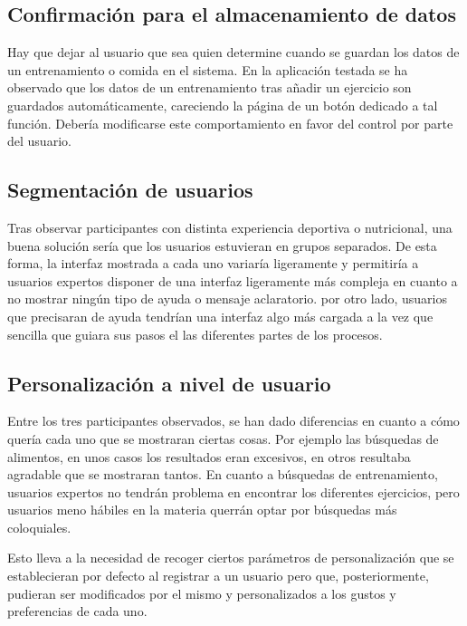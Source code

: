 \documentclass[a4paper]{article}
\begin{document}
	\subsection{Confirmación para el almacenamiento de datos}
	
	Hay que dejar al usuario que sea quien determine cuando se guardan los datos de un entrenamiento o comida en el sistema. En la aplicación testada se ha observado que los datos de un entrenamiento tras añadir un ejercicio son guardados automáticamente, careciendo la página de un botón dedicado a tal función. Debería modificarse este comportamiento en favor del control por parte del usuario.
	
	\subsection{Segmentación de usuarios}
	
	Tras observar participantes con distinta experiencia deportiva o nutricional, una buena solución sería que los usuarios estuvieran en grupos separados. De esta forma, la interfaz mostrada a cada uno variaría ligeramente y permitiría a usuarios expertos disponer de una interfaz ligeramente más compleja en cuanto a no mostrar ningún tipo de ayuda o mensaje aclaratorio. por otro lado, usuarios que precisaran de ayuda tendrían una interfaz algo más cargada a la vez que sencilla que guiara sus pasos el las diferentes partes de los procesos.
	
	\subsection{Personalización a nivel de usuario}
	
	Entre los tres participantes observados, se han dado diferencias en cuanto a cómo quería cada uno que se mostraran ciertas cosas. Por ejemplo las búsquedas de alimentos, en unos casos los resultados eran excesivos, en otros resultaba agradable que se mostraran tantos. En cuanto a búsquedas de entrenamiento, usuarios expertos no tendrán problema en encontrar los diferentes ejercicios, pero usuarios meno hábiles en la materia querrán optar por búsquedas más coloquiales.
	
	Esto lleva a la necesidad de recoger ciertos parámetros de personalización que se establecieran por defecto al registrar a un usuario pero que, posteriormente, pudieran ser modificados por el mismo y personalizados a los gustos y preferencias de cada uno.
	
\end{document}
